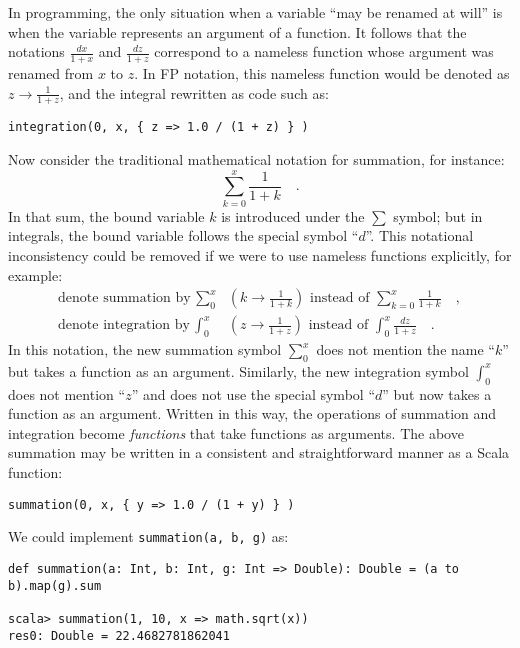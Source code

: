 In programming, the only situation when a variable \textsf{``}may be renamed
at will\textsf{''} is when the variable represents an argument of a function.
It follows that the notations $\frac{dx}{1+x}$ and $\frac{dz}{1+z}$
correspond to a nameless function whose argument was renamed from
$x$ to $z$. In FP notation, this nameless function would be denoted
as $z\rightarrow\frac{1}{1+z}$, and the integral rewritten as code
such as:
\begin{lstlisting}
integration(0, x, { z => 1.0 / (1 + z) } )
\end{lstlisting}
Now consider the traditional mathematical notation for summation,
for instance:
\[
\sum_{k=0}^{x}\frac{1}{1+k}\quad.
\]
In that sum, the bound variable $k$ is introduced under the $\sum$
symbol; but in integrals, the bound variable follows the special symbol
\textsf{``}$d$\textsf{''}. This notational inconsistency could be removed if we were
to use nameless functions explicitly, for example:
\begin{align*}
\text{denote summation by }\sum_{0}^{x} & \left(k\rightarrow\frac{1}{1+k}\right)\text{ instead of }\sum_{k=0}^{x}\frac{1}{1+k}\quad,\\
\text{denote integration by }\int_{0}^{x} & \left(z\rightarrow\frac{1}{1+z}\right)\text{ instead of }\int_{0}^{x}\frac{dz}{1+z}\quad.
\end{align*}
In this notation, the new summation symbol $\sum_{0}^{x}$ does not
mention the name \textsf{``}$k$\textsf{''} but takes a function as an argument. Similarly,
the new integration symbol $\int_{0}^{x}$ does not mention \textsf{``}$z$\textsf{''}
and does not use the special symbol \textsf{``}$d$\textsf{''} but now takes a function
as an argument. Written in this way, the operations of summation and
integration become \emph{functions} that take functions as arguments.
The above summation may be written in a consistent and straightforward
manner as a Scala function:
\begin{lstlisting}
summation(0, x, { y => 1.0 / (1 + y) } )
\end{lstlisting}

We could implement \texttt{}\lstinline!summation(a, b, g)! as:
\begin{lstlisting}
def summation(a: Int, b: Int, g: Int => Double): Double = (a to b).map(g).sum

scala> summation(1, 10, x => math.sqrt(x))
res0: Double = 22.4682781862041
\end{lstlisting}


